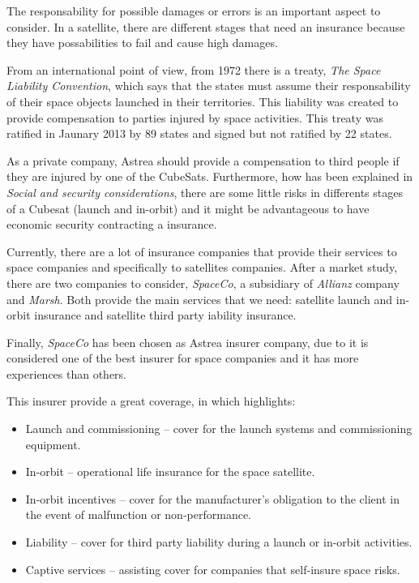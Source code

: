 The responsability for possible damages or errors is an important aspect to consider. In a satellite, there are different stages that need an insurance because they have possabilities to fail and cause high damages.

From an international point of view, from 1972 there is a treaty, \textit{The Space Liability Convention}, which says that the states must assume their responsability of their space objects launched in their territories. This liability was created to provide compensation to parties injured by space activities. This treaty was ratified in Jaunary 2013 by 89 states and signed but not ratified by 22 states. \cite{UN}

As a private company, Astrea should provide a compensation to third people if they are injured by one of the CubeSats. Furthermore,  how has been explained in \textit{Social and security considerations}, there are some little risks in differents stages of a Cubesat (launch and in-orbit) and it might be advantageous to have economic security contracting a insurance. 

Currently, there are a lot of insurance companies that provide their services to space companies and specifically to  satellites companies. After a market study, there are two companies to consider, \textit{SpaceCo}, a subsidiary of \textit{Allianz} company and \textit{Marsh}. Both provide the main services that we need: satellite launch and in-orbit insurance and satellite third party iability insurance.

Finally, \textit{SpaceCo} has been chosen as Astrea insurer company, due to it is considered one of the best insurer for space companies and it has more experiences than others.

This insurer provide a great coverage, in which highlights:

\begin{itemize}

	\item Launch and commissioning – cover for the launch systems and commissioning equipment.
	\item In-orbit – operational life insurance for the space satellite.
	\item In-orbit incentives – cover for the manufacturer’s obligation to the client in the event of malfunction 		          or non-performance.
	\item Liability – cover for third party liability during a launch or in-orbit activities.
	\item Captive services – assisting cover for companies that self-insure space risks. \cite{allianz}

\end{itemize}

